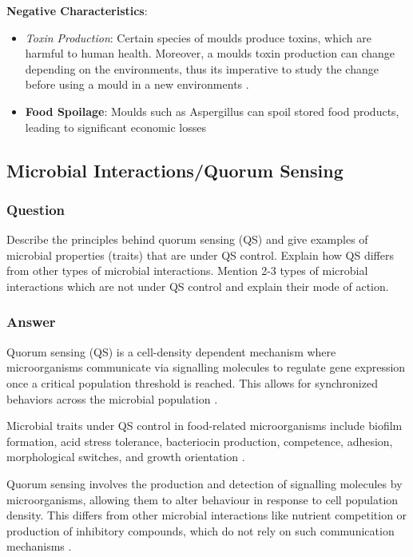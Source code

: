 \vspace{0.5em}  
\textbf{Negative Characteristics}:
\begin{itemize}
    \item \textit{Toxin Production}: Certain species of moulds produce toxins, which are harmful to human health. Moreover, a moulds toxin production can change depending on the environments, thus its imperative to study the change before using a mould in a new environments \cite*{LS03}.
    \item \textbf{Food Spoilage}: Moulds such as Aspergillus can spoil stored food products, leading to significant economic losses \cite*{L1-DiversityMicro}
\end{itemize}

\subsection{Microbial Interactions/Quorum Sensing}
\subsubsection*{Question}
Describe the principles behind quorum sensing (QS) and give examples of microbial properties (traits) that are under QS control. Explain how QS differs from other types of microbial interactions. Mention 2-3 types of microbial interactions which are not under QS control and explain their mode of action.  

\subsubsection*{Answer}
Quorum sensing (QS) is a cell-density dependent mechanism where microorganisms communicate via signalling molecules to regulate gene expression once a critical population threshold is reached. This allows for synchronized behaviors across the microbial population \cite*{L8-ImpQuorum}.

Microbial traits under QS control in food-related microorganisms include biofilm formation, acid stress tolerance, bacteriocin production, competence, adhesion, morphological switches, and growth orientation \cite*{L8-ImpQuorum}.

Quorum sensing involves the production and detection of signalling molecules by microorganisms, allowing them to alter behaviour in response to cell population density. This differs from other microbial interactions like nutrient competition or production of inhibitory compounds, which do not rely on such communication mechanisms \cite*{L8-ImpQuorum}.

